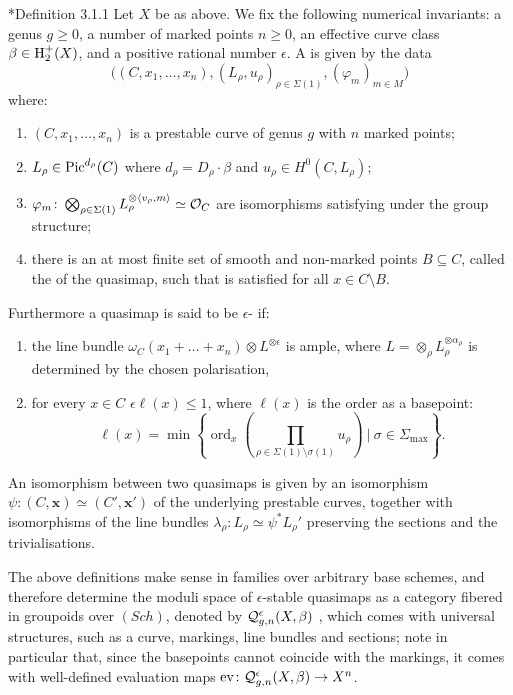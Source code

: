 \begin{definition}\cite{CF-K}*{Definition 3.1.1} Let $X$ be as above. We fix the following numerical invariants: a genus $g \geq 0$, a number of marked points $n \geq 0$, an effective curve class $\beta \in \operatorname{H}_2^+(X)$, and a positive rational number $\epsilon$. A  is given by the data
\begin{equation*} \Big((C,x_1,\ldots,x_n), (L_\rho,u_\rho)_{\rho \in \Sigma(1)}, (\varphi_m)_{m \in M}\Big) \end{equation*}
where:
\begin{enumerate}
\item $(C,x_1,\ldots,x_n)$ is a prestable curve of genus $g$ with $n$ marked points;
\item $L_\rho\in\operatorname{Pic}^{d_\rho}(C)$  where $d_\rho = D_\rho \cdot \beta$ and $u_\rho\in H^0(C,L_\rho)$;
\item $\varphi_m \colon \bigotimes_{\rho \in \Sigma(1)} L_\rho^{\otimes \langle v_\rho, m \rangle} \simeq \mathcal{O}_C$ are isomorphisms satisfying  under the group structure;
\item there is an at most finite set of smooth and non-marked points $B \subseteq C$, called the  of the quasimap, such that  is satisfied for all $x \in C \setminus B$.
\end{enumerate}
Furthermore a quasimap is said to be $\epsilon$- if:
\begin{enumerate}[resume]
 \item the line bundle $ \omega_C(x_1 + \ldots + x_n)\otimes L^{\otimes \epsilon}$ is ample, where $L = \otimes_\rho L_\rho^{\otimes \alpha_\rho}$ is determined by the chosen polarisation,
 \item for every $x\in C$ $\epsilon \ell(x)\leq 1$, where $\ell(x)$ is the order as a basepoint:
\[\ell(x)=\min\left\{\operatorname{ord}_x\left(\prod_{\rho\in\Sigma(1)\setminus \sigma(1)}u_\rho\right)\ |\ \sigma\in\Sigma_{\operatorname{max}}\right\}.\]
\end{enumerate}
An isomorphism between two quasimaps is given by an isomorphism $\psi\colon (C,\mathbf x)\simeq(C',\mathbf x')$ of the underlying prestable curves, together with isomorphisms of the line bundles $\lambda_\rho\colon L_\rho\simeq \psi^* L_\rho'$ preserving the sections and the trivialisations.
\end{definition}

The above definitions make sense in families over arbitrary base schemes, and therefore determine the moduli space of $\epsilon$-stable quasimaps as a category fibered in groupoids over $(Sch)$, denoted by $\mathcal{Q}^{\epsilon}_{g,n}(X,\beta)$ , which comes with universal structures, such as a curve, markings, line bundles and sections; note in particular that, since the basepoints cannot coincide with the markings, it comes with well-defined evaluation maps $\operatorname{ev}\colon \mathcal{Q}^{\epsilon}_{g,n}(X,\beta)\rightarrow X^n$.

